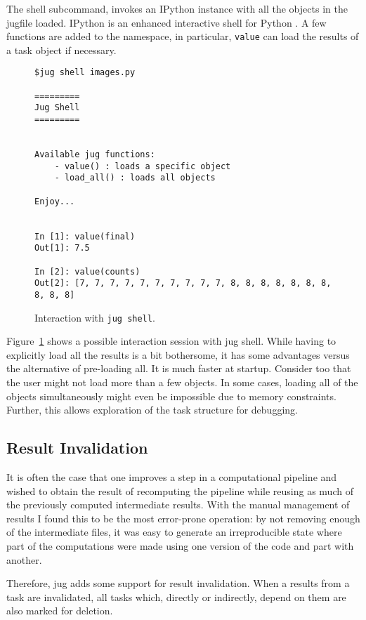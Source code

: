 \documentclass{article}
\let\code\texttt
\begin{document}
The shell subcommand, invokes an IPython instance with all the objects in the
jugfile loaded. IPython is an enhanced interactive shell for Python
\citep{Perez2007}. A few functions are added to the namespace, in particular,
\code{value} can load the results of a task object if necessary.

\begin{figure}
\begin{center}
\begin{verbatim}
$jug shell images.py

=========
Jug Shell
=========


Available jug functions:
    - value() : loads a specific object
    - load_all() : loads all objects

Enjoy...


In [1]: value(final)
Out[1]: 7.5

In [2]: value(counts)
Out[2]: [7, 7, 7, 7, 7, 7, 7, 7, 7, 7, 8, 8, 8, 8, 8, 8, 8, 8, 8, 8]
\end{verbatim}
\end{center}
\caption{Interaction with \code{jug shell}.}
\label{fig:jug-shell-interaction}
\end{figure}

Figure~\ref{fig:jug-shell-interaction} shows a possible interaction session
with jug shell. While having to explicitly load all the results is a bit
bothersome, it has some advantages versus the alternative of pre-loading all.
It is much faster at startup. Consider too that the user might not load more
than a few objects. In some cases, loading all of the objects simultaneously
might even be impossible due to memory constraints. Further, this allows
exploration of the task structure for debugging.

\subsection{Result Invalidation}

It is often the case that one improves a step in a computational pipeline and
wished to obtain the result of recomputing the pipeline while reusing as much
of the previously computed intermediate results. With the manual management of
results I found this to be the most error-prone operation: by not removing
enough of the intermediate files, it was easy to generate an irreproducible
state where part of the computations were made using one version of the code
and part with another.

Therefore, jug adds some support for result invalidation. When a results from a
task are invalidated, all tasks which, directly or indirectly, depend on them
are also marked for deletion.
\end{document}
